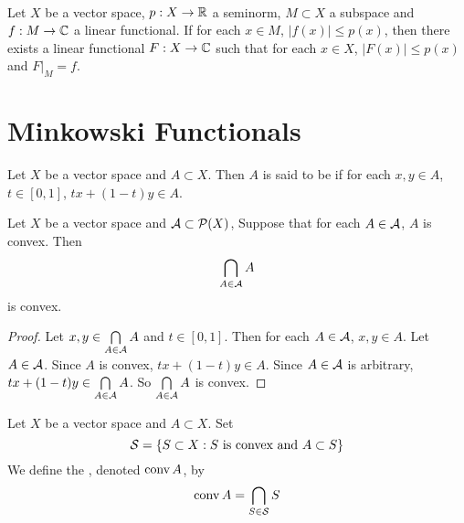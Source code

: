 \documentclass{book}
\begin{document}
	\begin{thm}\\
		Let $X$ be a vector space, $p:X \rightarrow \mathbb{R}$ a seminorm, $M \subset X$ a subspace and $f:M \rightarrow \mathbb{C}$ a linear functional. If for each $x \in M$, $\vert f(x) \vert \leq p(x)$, then there exists a linear functional $F:X \rightarrow \mathbb{C}$ such that for each $x \in X$, $\vert F(x) \vert \leq p(x)$ and $F|_{M}=f$.
	\end{thm}	






















	
	\newpage
	\section{Minkowski Functionals}

	\begin{defn}
		Let $X$ be a vector space and $A \subset X$. Then $A$ is said to be  if for each $x, y \in A$, $t \in [0,1]$, $tx +(1-t)y \in A$.
	\end{defn}

	\begin{ex}
		Let $X$ be a vector space and $\mathcal{A} \subset \mathcal{P}(X)$, Suppose that for each $A \in \mathcal{A}$, $A$ is convex. Then $$\bigcap_{A \in \mathcal{A}} A$$ is convex.
	\end{ex}

	\begin{proof}
		Let $x,y \in \bigcap\limits_{A \in \mathcal{A}} A$ and $t \in [0,1]$. Then for each $A \in \mathcal{A}$, $x,y \in A$. Let $A \in \mathcal{A}$. Since $A$ is convex, $tx + (1-t)y \in A$. Since $A \in \mathcal{A}$ is arbitrary, $tx + (1-t)y \in \bigcap\limits_{A \in \mathcal{A}} A$. So $\bigcap\limits_{A \in \mathcal{A}} A $ is convex.
	\end{proof}

	\begin{defn}
		Let $X$ be a vector space and $A \subset X$. Set 
		$$\mathcal{S} = \{S \subset X: S \text{ is convex and } A \subset S\}$$ 
		We define the , denoted $\operatorname{conv} A$, by $$\operatorname{conv} A = \bigcap_{S \in \mathcal{S}}S$$
	\end{defn}
\end{document}
